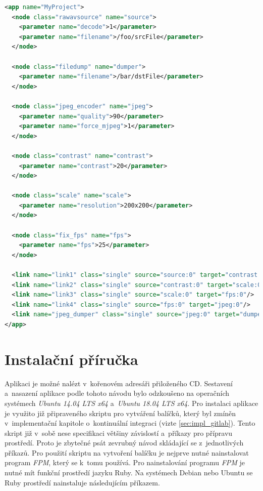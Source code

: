 \documentclass[thesis=M,czech]{FITthesis}[2012/06/26]
\begin{document}
\begin{lstlisting}[language=XML]
<app name="MyProject">
  <node class="rawavsource" name="source">
    <parameter name="decode">1</parameter>
    <parameter name="filename">/foo/srcFile</parameter>
  </node>

  <node class="filedump" name="dumper">
    <parameter name="filename">/bar/dstFile</parameter>
  </node>

  <node class="jpeg_encoder" name="jpeg">
    <parameter name="quality">90</parameter>
    <parameter name="force_mjpeg">1</parameter>
  </node>

  <node class="contrast" name="contrast">
    <parameter name="contrast">20</parameter>
  </node>

  <node class="scale" name="scale">
    <parameter name="resolution">200x200</parameter>
  </node>

  <node class="fix_fps" name="fps">
    <parameter name="fps">25</parameter>
  </node>

  <link name="link1" class="single" source="source:0" target="contrast:0"/>
  <link name="link2" class="single" source="contrast:0" target="scale:0"/>
  <link name="link3" class="single" source="scale:0" target="fps:0"/>
  <link name="link4" class="single" source="fps:0" target="jpeg:0"/>
  <link name="jpeg_dumper" class="single" source="jpeg:0" target="dumper:0"/>
</app>
\end{lstlisting}

\section{Instalační příručka} \label{sec:impl_prirucka}
Aplikaci je možné nalézt v~kořenovém adresáři přiloženého CD. Sestavení a~nasazení aplikace podle tohoto návodu bylo odzkoušeno na operačních systémech \textit{Ubuntu 14.04 LTS x64} a~\textit{Ubuntu 18.04 LTS x64}. Pro instalaci aplikace je využito již připraveného skriptu pro vytváření balíčků, který byl zmíněn v~implementační kapitole o~kontinuální integraci (vizte \ref{sec:impl_gitlab}). Tento skript již v~sobě nese specifikaci většiny závislostí a~příkazy pro přípravu prostředí. Proto je zbytečné psát zevrubný návod skládající se z~jednotlivých příkazů. Pro použití skriptu na vytvoření balíčku je nejprve nutné nainstalovat program \textit{FPM}, který se k~tomu používá. Pro nainstalování programu \textit{FPM} je nutné mít funkční prostředí jazyku Ruby. Na systémech Debian nebo Ubuntu se Ruby prostředí nainstaluje následujícím příkazem.\\
\end{document}
